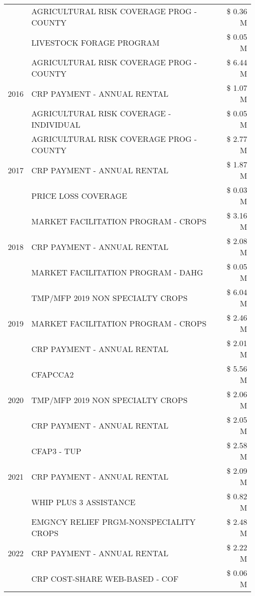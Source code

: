 \begin{tabular}{llr}
 & AGRICULTURAL RISK COVERAGE PROG - COUNTY & \$ 0.36 M \\
 & LIVESTOCK FORAGE PROGRAM & \$ 0.05 M \\
\cline{1-3}
\multirow[t]{3}{*}{2016} & AGRICULTURAL RISK COVERAGE PROG - COUNTY & \$ 6.44 M \\
 & CRP PAYMENT - ANNUAL RENTAL & \$ 1.07 M \\
 & AGRICULTURAL RISK COVERAGE - INDIVIDUAL & \$ 0.05 M \\
\cline{1-3}
\multirow[t]{3}{*}{2017} & AGRICULTURAL RISK COVERAGE PROG - COUNTY & \$ 2.77 M \\
 & CRP PAYMENT - ANNUAL RENTAL & \$ 1.87 M \\
 & PRICE LOSS COVERAGE & \$ 0.03 M \\
\cline{1-3}
\multirow[t]{3}{*}{2018} & MARKET FACILITATION PROGRAM - CROPS & \$ 3.16 M \\
 & CRP PAYMENT - ANNUAL RENTAL & \$ 2.08 M \\
 & MARKET FACILITATION PROGRAM - DAHG & \$ 0.05 M \\
\cline{1-3}
\multirow[t]{3}{*}{2019} & TMP/MFP 2019 NON SPECIALTY CROPS & \$ 6.04 M \\
 & MARKET FACILITATION PROGRAM - CROPS & \$ 2.46 M \\
 & CRP PAYMENT - ANNUAL RENTAL & \$ 2.01 M \\
\cline{1-3}
\multirow[t]{3}{*}{2020} & CFAPCCA2 & \$ 5.56 M \\
 & TMP/MFP 2019 NON SPECIALTY CROPS & \$ 2.06 M \\
 & CRP PAYMENT - ANNUAL RENTAL & \$ 2.05 M \\
\cline{1-3}
\multirow[t]{3}{*}{2021} & CFAP3 - TUP & \$ 2.58 M \\
 & CRP PAYMENT - ANNUAL RENTAL & \$ 2.09 M \\
 & WHIP PLUS 3 ASSISTANCE & \$ 0.82 M \\
\cline{1-3}
\multirow[t]{3}{*}{2022} & EMGNCY RELIEF PRGM-NONSPECIALITY CROPS & \$ 2.48 M \\
 & CRP PAYMENT - ANNUAL RENTAL & \$ 2.22 M \\
 & CRP COST-SHARE WEB-BASED - COF & \$ 0.06 M \\
\cline{1-3}
\bottomrule
\end{tabular}
